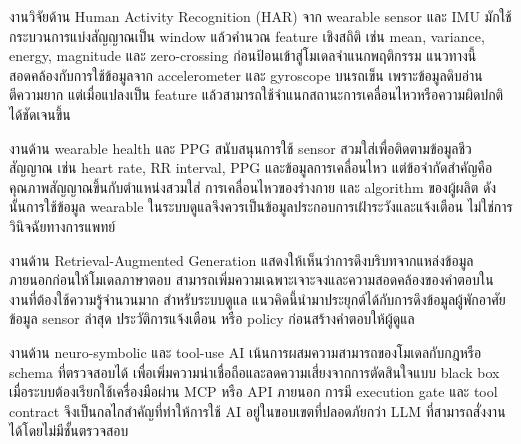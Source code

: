 งานวิจัยด้าน Human Activity Recognition (HAR) จาก wearable sensor และ IMU มักใช้กระบวนการแบ่งสัญญาณเป็น window แล้วคำนวณ feature เชิงสถิติ เช่น mean, variance, energy, magnitude และ zero-crossing ก่อนป้อนเข้าสู่โมเดลจำแนกพฤติกรรม \cite{Lara2013WearableHAR} แนวทางนี้สอดคล้องกับการใช้ข้อมูลจาก accelerometer และ gyroscope บนรถเข็น เพราะข้อมูลดิบอ่านตีความยาก แต่เมื่อแปลงเป็น feature แล้วสามารถใช้จำแนกสถานะการเคลื่อนไหวหรือความผิดปกติได้ชัดเจนขึ้น

งานด้าน wearable health และ PPG สนับสนุนการใช้ sensor สวมใส่เพื่อติดตามข้อมูลชีวสัญญาณ เช่น heart rate, RR interval, PPG และข้อมูลการเคลื่อนไหว แต่ข้อจำกัดสำคัญคือคุณภาพสัญญาณขึ้นกับตำแหน่งสวมใส่ การเคลื่อนไหวของร่างกาย และ algorithm ของผู้ผลิต \cite{PolarBLESDK,PolarVeritySenseWhitepaper} ดังนั้นการใช้ข้อมูล wearable ในระบบดูแลจึงควรเป็นข้อมูลประกอบการเฝ้าระวังและแจ้งเตือน ไม่ใช่การวินิจฉัยทางการแพทย์

งานด้าน Retrieval-Augmented Generation แสดงให้เห็นว่าการดึงบริบทจากแหล่งข้อมูลภายนอกก่อนให้โมเดลภาษาตอบ สามารถเพิ่มความเฉพาะเจาะจงและความสอดคล้องของคำตอบในงานที่ต้องใช้ความรู้จำนวนมาก \cite{Lewis2020RAG} สำหรับระบบดูแล แนวคิดนี้นำมาประยุกต์ได้กับการดึงข้อมูลผู้พักอาศัย ข้อมูล sensor ล่าสุด ประวัติการแจ้งเตือน หรือ policy ก่อนสร้างคำตอบให้ผู้ดูแล

งานด้าน neuro-symbolic และ tool-use AI เน้นการผสมความสามารถของโมเดลกับกฎหรือ schema ที่ตรวจสอบได้ เพื่อเพิ่มความน่าเชื่อถือและลดความเสี่ยงจากการตัดสินใจแบบ black box \cite{Susskind2021NeuroSymbolic,ColeloughRegli2025NeuroSymbolic} เมื่อระบบต้องเรียกใช้เครื่องมือผ่าน MCP หรือ API ภายนอก การมี execution gate และ tool contract จึงเป็นกลไกสำคัญที่ทำให้การใช้ AI อยู่ในขอบเขตที่ปลอดภัยกว่า LLM ที่สามารถสั่งงานได้โดยไม่มีชั้นตรวจสอบ

